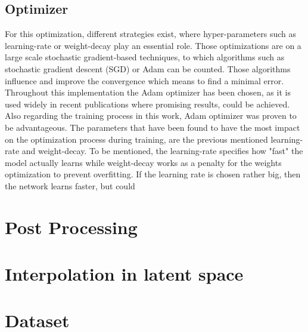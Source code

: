 \subsection{Optimizer}
For this optimization, different strategies exist, where hyper-parameters such as learning-rate or weight-decay play an essential role. Those optimizations are on a large scale stochastic gradient-based techniques, to which algorithms such as stochastic gradient descent (SGD) or Adam can be counted. Those algorithms influence and improve the convergence which means to find a minimal error. Throughout this implementation the Adam optimizer \cite{Kingma2014} has been chosen, as it is used widely in recent publications where promising results, could be achieved. Also regarding the training process in this work, Adam optimizer was proven to be advantageous. The parameters that have been found to have the most impact on the optimization process during training, are the previous mentioned learning-rate and weight-decay. To be mentioned, the learning-rate specifies how "fast" the model actually learns while weight-decay works as a penalty for the weights optimization to prevent overfitting. If the learning rate is chosen rather big, then the network learns faster, but could 


\section{Post Processing}
\label{sec:app_post_processing}

\section{Interpolation in latent space}
\label{sec:app_interpolation}

\section{Dataset}
\label{sec:app_dataset}